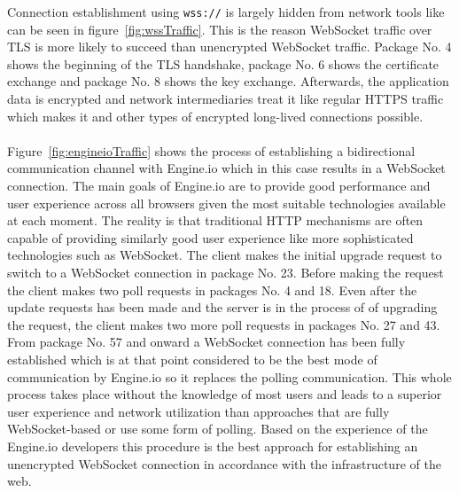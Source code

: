 \noindent
Connection establishment using \texttt{wss://} is largely hidden from network tools like can be seen in figure~\ref{fig:wssTraffic}. This is the reason WebSocket traffic over TLS is more likely to succeed than unencrypted WebSocket traffic. Package No. 4 shows the beginning of the TLS handshake, package No. 6 shows the certificate exchange and package No. 8 shows the key exchange. Afterwards, the application data is encrypted and network intermediaries treat it like regular HTTPS traffic which makes it and other types of encrypted long-lived connections possible.
\\ \\
Figure~\ref{fig:engineioTraffic} shows the process of establishing a bidirectional communication channel with Engine.io which in this case results in a WebSocket connection. The main goals of Engine.io are to provide good performance and user experience across all browsers given the most suitable technologies available at each moment. The reality is that traditional HTTP mechanisms are often capable of providing similarly good user experience like more sophisticated technologies such as WebSocket. The client makes the initial upgrade request to switch to a WebSocket connection in package No. 23. Before making the request the client makes two poll requests in packages No. 4 and 18. Even after the update requests has been made and the server is in the process of of upgrading the request, the client makes two more poll requests in packages No. 27 and 43. From package No. 57 and onward a WebSocket connection has been fully established which is at that point considered to be the best mode of communication by Engine.io so it replaces the polling communication. This whole process takes place without the knowledge of most users and leads to a superior user experience and network utilization than approaches that are fully WebSocket-based or use some form of polling. Based on the experience of the Engine.io developers this procedure is the best approach for establishing an unencrypted WebSocket connection in accordance with the infrastructure of the web.

